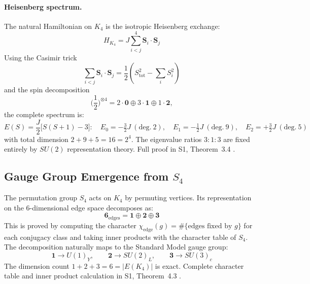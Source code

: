 \documentclass[11pt,a4paper]{article}
\theoremstyle{definition}
\begin{document}
\paragraph{Heisenberg spectrum.} The natural Hamiltonian on $K_4$ is the isotropic Heisenberg exchange:
\begin{equation}
H_{K_4} = J \sum_{i<j}^{4} \mathbf{S}_i \cdot \mathbf{S}_j
\label{eq:HK4}
\end{equation}
Using the Casimir trick 
\begin{equation}
\sum_{i<j} \mathbf{S}_i \cdot \mathbf{S}_j = \frac{1}{2}(S^2_{\text{tot}} - \sum_i S^2_i)
\label{eq:casimir}
\end{equation}
and the spin decomposition 
\begin{equation}
\Big(\frac{1}{2}\Big)^{\otimes 4} = 2 \cdot \mathbf{0} \oplus 3 \cdot \mathbf{1} \oplus 1 \cdot \mathbf{2},
\label{eq:spin_decomp}
\end{equation}
the complete spectrum is:
\begin{equation}
E(S) = \frac{J}{2}\bigl[S(S+1) - 3\bigr]: \quad
E_0 = -\tfrac{3}{2}J~(\text{deg.}~2),\quad
E_1 = -\tfrac{1}{2}J~(\text{deg.}~9),\quad
E_2 = +\tfrac{3}{2}J~(\text{deg.}~5)
\label{eq:K4spectrum}
\end{equation}
with total dimension $2 + 9 + 5 = 16 = 2^4$. The eigenvalue ratios $3 : 1 : 3$ are fixed entirely by $SU(2)$ representation theory. Full proof in S1, Theorem~3.4 \cite{Hubka2026QSDsupp}.

\subsection{Gauge Group Emergence from $S_4$}

The permutation group $S_4$ acts on $K_4$ by permuting vertices. Its representation on the 6-dimensional edge space decomposes as:
\begin{equation}
\mathbf{6}_{\text{edges}} = \mathbf{1} \oplus \mathbf{2} \oplus \mathbf{3}
\label{eq:edge_decomp}
\end{equation}
This is proved by computing the character $\chi_{\text{edge}}(g) = \#\{\text{edges fixed by } g\}$ for each conjugacy class and taking inner products with the character table of $S_4$. The decomposition naturally maps to the Standard Model gauge group:
\begin{equation}
\mathbf{1} \to U(1)_Y, \qquad \mathbf{2} \to SU(2)_L, \qquad \mathbf{3} \to SU(3)_c
\end{equation}
The dimension count $1 + 2 + 3 = 6 = |E(K_4)|$ is exact. Complete character table and inner product calculation in S1, Theorem~4.3 \cite{Hubka2026QSDsupp}.
\end{document}
